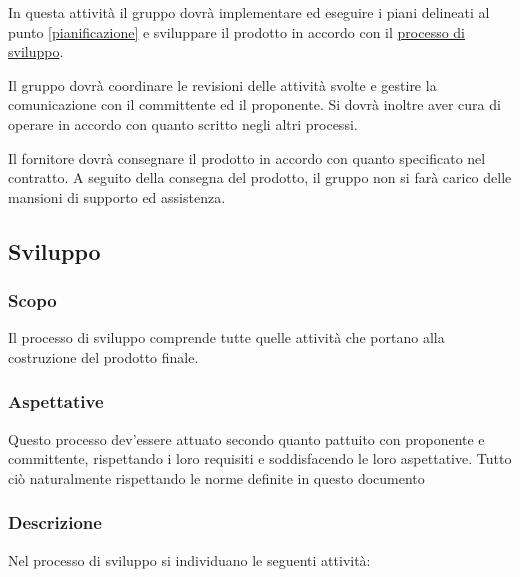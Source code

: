             In questa attività il gruppo \group{} dovrà implementare ed eseguire i piani delineati al punto \ref{pianificazione} e sviluppare il prodotto in accordo con il \hyperref[sviluppo]{processo di sviluppo}.

            Il gruppo dovrà coordinare le revisioni delle attività svolte e gestire la comunicazione con il committente ed il proponente. Si dovrà inoltre aver cura di operare in accordo con quanto scritto negli altri processi.


            Il fornitore dovrà consegnare il prodotto in accordo con quanto specificato nel contratto. A seguito della consegna del prodotto, il gruppo \group{}  non si farà carico delle mansioni di supporto ed assistenza.
            

\subsection{Sviluppo}
\label{sviluppo}
    \subsubsection{Scopo}
        Il processo di sviluppo comprende tutte quelle attività che portano alla costruzione del prodotto finale.
    \subsubsection{Aspettative}
        Questo processo dev'essere attuato secondo quanto pattuito con proponente e committente, rispettando i loro requisiti e soddisfacendo le loro aspettative. Tutto ciò naturalmente rispettando le norme definite in questo documento
    \subsubsection{Descrizione}
        Nel processo di sviluppo si individuano  le seguenti attività:

